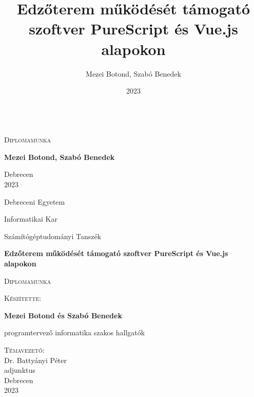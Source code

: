 \documentclass[12pt]{article}
\title{Edzőterem működését támogató szoftver PureScript és Vue.js alapokon}
\author{Mezei Botond, Szabó Benedek}
\date{2023}
\begin{document}
\begin{titlepage}

	\begin{center}
	\mbox{}\\
	\vspace{35mm}
	\huge
	\textsc{Diplomamunka}
	\end{center}

	
	\vspace{55mm}
	\Large
	\hspace*{\fill} 
	\textbf{Mezei Botond, Szabó Benedek}
	
	\begin{center}
	\vspace{55mm}
	Debrecen\\	
	2023
	
	\end{center}
\end{titlepage}
\begin{titlepage}

	\vspace*{-2cm}
	\hspace*{-1.5cm}

	\begin{center}
	\large
	Debreceni Egyetem
	
	Informatikai Kar	

	Számítógéptudományi Tanszék
	
	\vspace{17mm}
	\huge
	\LARGE
    \textbf{Edzőterem működését támogató szoftver PureScript és Vue.js alapokon}
	
	\vspace{15mm}
	\large
	\textsc{Diplomamunka}
	
	\normalsize
	\vspace{20mm}
	\textsc{Készítette:}
	
	\vspace{5mm}
	\Large
	\textbf{Mezei Botond és Szabó Benedek}
	
	\normalsize
	programtervező informatika szakos hallgatók
	
	\vspace{18mm}
	\textsc{Témavezető:}\\
	\vspace{5mm}
	\large
	Dr. Battyányi Péter \\
	\normalsize
	adjunktus\\
	
	\vspace{32mm}
	Debrecen\\	
	2023
	
	\end{center}
\end{titlepage}
\newpage
\tableofcontents
\newpage
\end{document}
